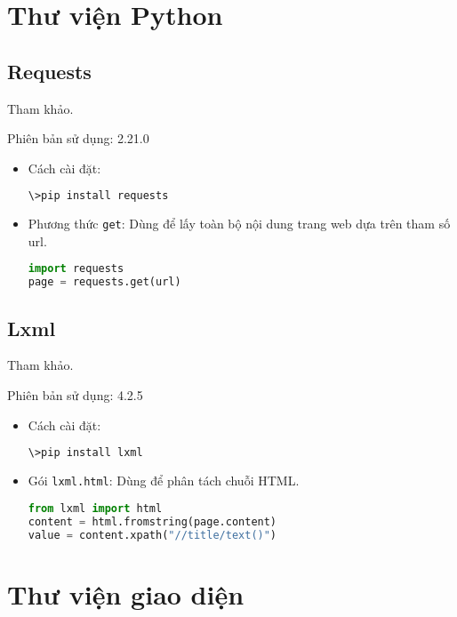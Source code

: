 \section{Thư viện Python}
\subsection{Requests}
Tham khảo\cite{requests}.
\par
Phiên bản sử dụng: 2.21.0
\begin{itemize}
	\item Cách cài đặt:
	\begin{lstlisting}[language=bash]
\>pip install requests
	\end{lstlisting}
	\item Phương thức \texttt{get}: Dùng để 	lấy toàn bộ nội dung trang web dựa trên tham số url.
	\begin{lstlisting}[language=Python]
import requests
page = requests.get(url)
	\end{lstlisting}
\end{itemize}
\subsection{Lxml}
Tham khảo\cite{lxml}.
\par
Phiên bản sử dụng: 4.2.5
\begin{itemize}
	\item Cách cài đặt:
	\begin{lstlisting}[language=bash]
\>pip install lxml
	\end{lstlisting}
	\item Gói \texttt{lxml.html}: Dùng để phân tách chuỗi HTML.
	\begin{lstlisting}[language=Python]
from lxml import html
content = html.fromstring(page.content)
value = content.xpath("//title/text()")
	\end{lstlisting}
\end{itemize}
\section{Thư viện giao diện}
